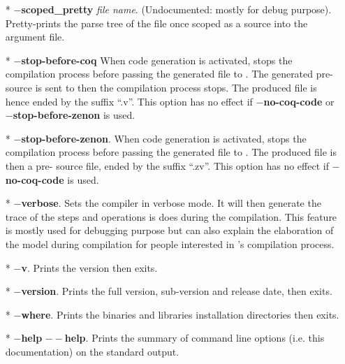 \begin{itemize}
  \item[*] {\bf $-$scoped\_pretty} {\em file name}. (Undocumented:
    mostly for debug purpose). Pretty-prints the parse tree of the
    {\focal} file once scoped as a {\focal} source into the argument
    file.

  \item[*] {\bf $-$stop-before-coq} When {\coq} code generation is
    activated, stops the compilation process before passing the
    generated file to {\coq}. The generated pre-{\coq} source is sent to
    {\zenon} then the compilation process stops. The produced file is
    hence ended by the suffix ``.v''. This option has no effect if
    {\bf $-$no-coq-code} or {\bf $-$stop-before-zenon} is used.

   \item[*] {\bf $-$stop-before-zenon}. When {\coq} code generation is
     activated, stops the compilation process before passing the
     generated file to {\zenon}. The produced file is then a pre-{\coq}
     source file, ended by the suffix ``.zv''. This option has no
     effect if {\bf $-$no-coq-code} is used.

  \item[*] {\bf $-$verbose}. Sets the compiler in verbose mode. It
    will then generate the trace of the steps and operations is does
    during the compilation. This feature is mostly used for debugging
    purpose but can also explain the elaboration of the model during
    compilation for people interested in {\focal}'s compilation
    process.

  \item[*] {\bf $-$v}. Prints the {\focal} version then exits.

  \item[*] {\bf $-$version}. Prints the full {\focal} version,
    sub-version and release date, then exits.

  \item[*] {\bf $-$where}. Prints the binaries and libraries
    installation directories then exits.

  \item[*] {\bf $-$help} {\bf $--$help}. Prints the summary of command
    line options (i.e. this documentation) on the standard output.
\end{itemize}
